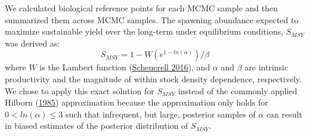 \documentclass[11pt]{book}
\begin{document}
\hypertarget{biological-reference-points}{%
\label{biological-reference-points}}

We calculated biological reference points for each MCMC sample and then summarized them across MCMC samples. The spawning abundance expected to maximize sustainable yield over the long-term under equilibrium conditions, \(S_{MSY}\) was derived as:
\begin{equation}
  S_{MSY} = 1 - W(e^{1-ln(\alpha)})/\beta
  \label{eq:get-Smsy}
\end{equation}
where \(W\) is the Lambert function (\protect\hyperlink{ref-scheuerellExplicitSolutionCalculating2016}{Scheuerell 2016}), and \(\alpha\) and \(\beta\) are intrinsic productivity and the magnitude of within stock density dependence, respectively. We chose to apply this exact solution for \(S_{MSY}\) instead of the commonly applied Hilborn (\protect\hyperlink{ref-hilborn1985simplified}{1985}) approximation because the approximation only holds for \(0 <ln(\alpha) \leq3\) such that infrequent, but large, posterior samples of \(\alpha\) can result in biased estimates of the posterior distribution of \(S_{MSY}\).
\end{document}
